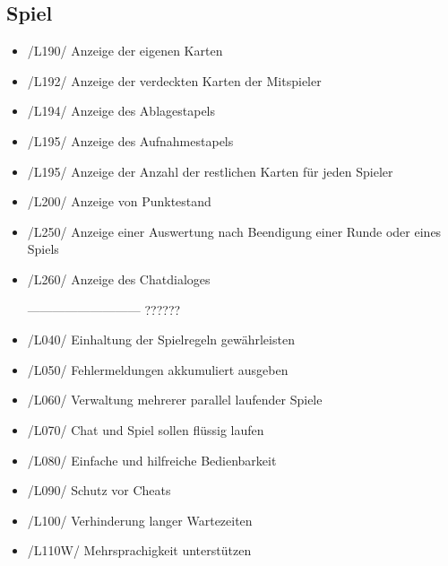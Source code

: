 \documentclass{article}
\begin{document}
\subsection{Spiel}
\begin{itemize}
	\item /L190/ Anzeige der eigenen Karten
	\item /L192/ Anzeige der verdeckten Karten der Mitspieler
	\item /L194/ Anzeige des Ablagestapels
	\item /L195/ Anzeige des Aufnahmestapels
	\item /L195/ Anzeige der Anzahl der restlichen Karten für jeden Spieler
	\item /L200/ Anzeige von Punktestand
	\item /L250/ Anzeige einer Auswertung nach Beendigung einer Runde oder eines Spiels
	\item /L260/ Anzeige des Chatdialoges

---------------------------
	??????
	\item /L040/ Einhaltung der Spielregeln gewährleisten
	\item /L050/ Fehlermeldungen akkumuliert ausgeben
	\item /L060/ Verwaltung mehrerer parallel laufender Spiele
	\item /L070/ Chat und Spiel sollen flüssig laufen
	\item /L080/ Einfache und hilfreiche Bedienbarkeit
	\item /L090/ Schutz vor Cheats
	\item /L100/ Verhinderung langer Wartezeiten
	\item /L110W/ Mehrsprachigkeit unterstützen
\end{itemize}
\end{document}
